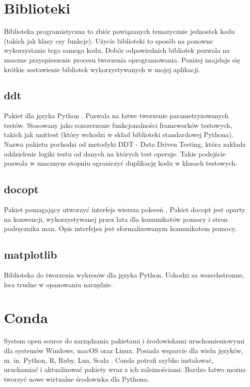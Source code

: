 \section{Biblioteki}
Biblioteka programistyczna to zbiór powiązanych tematycznie jednostek kodu (takich jak klasy czy funkcje). Użycie biblioteki to sposób na ponowne wykorzystanie tego samego kodu. Dobór odpowiednich bibliotek pozwala na znaczne przyspieszenie procesu tworzenia oprogramowania. Poniżej znajduje się krótkie zestawienie bibliotek wykorzystywanych w mojej aplikacji.

\subsection{ddt}
\label{DdtOpis}
Pakiet dla języka Python \cite{ddt:documentation}. Pozwala na łatwe tworzenie parametryzowanych testów. Stosowany jako rozszerzenie funkcjonalności frameworków testowych, takich jak unittest (który wchodzi w skład biblioteki standardowej Pythona). Nazwa pakietu pochodzi od metodyki DDT - Data Driven Testing, która zakłada oddzielenie logiki testu od danych na których test operuje. Takie podejście pozwala w znacznym stopniu ograniczyć duplikację kodu w klasach testowych.
\subsection{docopt}
\label{docoptOpis}
Pakiet pomagający utworzyć interfejs wiersza poleceń \cite{docopt:documentation}. Pakiet docopt jest oparty na konwencji, wykorzystywanej przez lata dla komunikatów pomocy i stron podręcznika man. Opis interfejsu jest sformalizowanym komunikatem pomocy.
\subsection{matplotlib}
\label{matplotlibDescription}
Biblioteka do tworzenia wykresów dla języka Python. Uchodzi za wszechstronne, lecz trudne w opanowaniu narzędzie.
\section{Conda}
System open source do zarządzania pakietami i środowiskami uruchomieniowymi dla systemów Windows, macOS oraz Linux. Posiada wsparcie dla wielu języków, m. in. Python, R, Ruby, Lua, Scala \cite{conda:documentation}.
Conda potrafi szybko instalować, uruchamiać i aktualizować pakiety wraz z ich zależnościami.
Bardzo łatwo można tworzyć nowe wirtualne środowiska dla Pythona.

